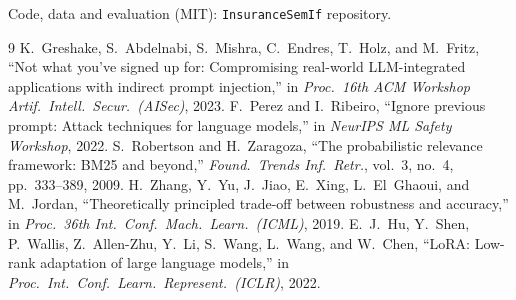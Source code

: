 \documentclass[conference]{IEEEtran}
\begin{document}
\vspace{0.4em}
\noindent Code, data and evaluation (MIT): \texttt{InsuranceSemIf} repository.

\begin{thebibliography}{9}
 K.~Greshake, S.~Abdelnabi, S.~Mishra, C.~Endres, T.~Holz, and M.~Fritz,
  ``Not what you've signed up for: Compromising real-world LLM-integrated applications with indirect prompt
  injection,'' in \emph{Proc.\ 16th ACM Workshop Artif.\ Intell.\ Secur.\ (AISec)}, 2023.
 F.~Perez and I.~Ribeiro, ``Ignore previous prompt: Attack techniques for language models,''
  in \emph{NeurIPS ML Safety Workshop}, 2022.
 S.~Robertson and H.~Zaragoza, ``The probabilistic relevance framework: BM25 and beyond,''
  \emph{Found.\ Trends Inf.\ Retr.}, vol.~3, no.~4, pp.~333--389, 2009.
 H.~Zhang, Y.~Yu, J.~Jiao, E.~Xing, L.~El~Ghaoui, and M.~Jordan, ``Theoretically principled
  trade-off between robustness and accuracy,'' in \emph{Proc.\ 36th Int.\ Conf.\ Mach.\ Learn.\ (ICML)}, 2019.
 E.~J.~Hu, Y.~Shen, P.~Wallis, Z.~Allen-Zhu, Y.~Li, S.~Wang, L.~Wang, and W.~Chen, ``LoRA: Low-rank
  adaptation of large language models,'' in \emph{Proc.\ Int.\ Conf.\ Learn.\ Represent.\ (ICLR)}, 2022.
\end{thebibliography}
\end{document}
